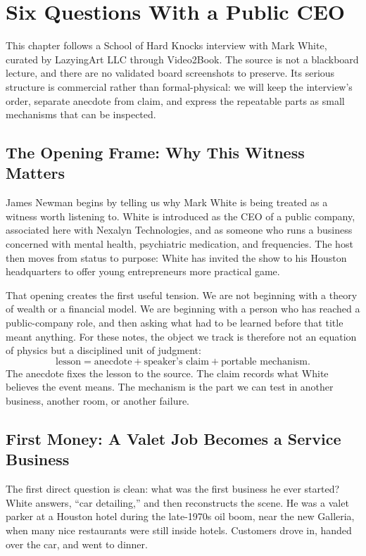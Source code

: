 \chapter{Six Questions With a Public CEO}

This chapter follows a School of Hard Knocks interview with Mark White, curated by LazyingArt LLC through Video2Book. The source is not a blackboard lecture, and there are no validated board screenshots to preserve. Its serious structure is commercial rather than formal-physical: we will keep the interview's order, separate anecdote from claim, and express the repeatable parts as small mechanisms that can be inspected.

\section{The Opening Frame: Why This Witness Matters}

James Newman begins by telling us why Mark White is being treated as a witness worth listening to. White is introduced as the CEO of a public company, associated here with Nexalyn Technologies, and as someone who runs a business concerned with mental health, psychiatric medication, and frequencies. The host then moves from status to purpose: White has invited the show to his Houston headquarters to offer young entrepreneurs more practical game.

That opening creates the first useful tension. We are not beginning with a theory of wealth or a financial model. We are beginning with a person who has reached a public-company role, and then asking what had to be learned before that title meant anything. For these notes, the object we track is therefore not an equation of physics but a disciplined unit of judgment:
\begin{equation}
\text{lesson}
=
\text{anecdote}
+
\text{speaker's claim}
+
\text{portable mechanism}.
\end{equation}
The anecdote fixes the lesson to the source. The claim records what White believes the event means. The mechanism is the part we can test in another business, another room, or another failure.

\section{First Money: A Valet Job Becomes a Service Business}

The first direct question is clean: what was the first business he ever started? White answers, ``car detailing,'' and then reconstructs the scene. He was a valet parker at a Houston hotel during the late-1970s oil boom, near the new Galleria, when many nice restaurants were still inside hotels. Customers drove in, handed over the car, and went to dinner.

